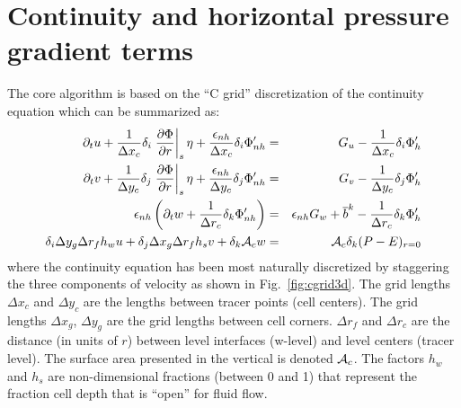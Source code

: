 

\section{Continuity and horizontal pressure gradient terms}

The core algorithm is based on the ``C grid'' discretization of the
continuity equation which can be summarized as:
\begin{eqnarray}
\partial_t u + \frac{1}{\Delta x_c} \delta_i \left. \frac{ \partial \Phi}{\partial r}\right|_{s} \eta + \frac{\epsilon_{nh}}{\Delta x_c} \delta_i \Phi_{nh}' & = & G_u - \frac{1}{\Delta x_c} \delta_i \Phi_h' \label{eq:discrete-momu} \\
\partial_t v + \frac{1}{\Delta y_c} \delta_j \left. \frac{ \partial \Phi}{\partial r}\right|_{s} \eta + \frac{\epsilon_{nh}}{\Delta y_c} \delta_j \Phi_{nh}' & = & G_v - \frac{1}{\Delta y_c} \delta_j \Phi_h' \label{eq:discrete-momv} \\
\epsilon_{nh} \left( \partial_t w + \frac{1}{\Delta r_c} \delta_k \Phi_{nh}' \right) & = & \epsilon_{nh} G_w + \overline{b}^k - \frac{1}{\Delta r_c} \delta_k \Phi_{h}' \label{eq:discrete-momw} \\
\delta_i \Delta y_g \Delta r_f h_w u +
\delta_j \Delta x_g \Delta r_f h_s v +
\delta_k {\cal A}_c w & = & {\cal A}_c \delta_k (P-E)_{r=0}
\label{eq:discrete-continuity}
\end{eqnarray}
where the continuity equation has been most naturally discretized by
staggering the three components of velocity as shown in
Fig.~\ref{fig:cgrid3d}. The grid lengths $\Delta x_c$ and $\Delta y_c$
are the lengths between tracer points (cell centers). The grid lengths
$\Delta x_g$, $\Delta y_g$ are the grid lengths between cell
corners. $\Delta r_f$ and $\Delta r_c$ are the distance (in units of
$r$) between level interfaces (w-level) and level centers (tracer
level). The surface area presented in the vertical is denoted ${\cal
A}_c$.  The factors $h_w$ and $h_s$ are non-dimensional fractions
(between 0 and 1) that represent the fraction cell depth that is
``open'' for fluid flow.

